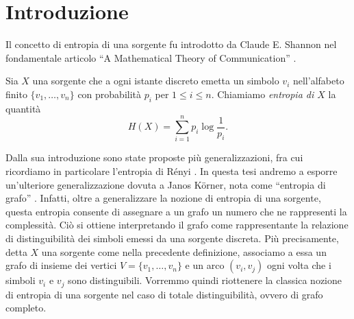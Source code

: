 \chapter{Introduzione} 
Il concetto di entropia di una sorgente fu introdotto da Claude E. Shannon nel fondamentale articolo ``A Mathematical Theory of Communication'' \cite{Shannon1948}.
\begin{definition}
  Sia \(X\) una sorgente che a ogni istante discreto emetta un simbolo \(v_i\) nell'alfabeto finito \(\{v_1,\dots,v_n\}\) con probabilit\`a \(p_i\) per \(1\le i\le n\). Chiamiamo \emph{entropia di \(X\)} la quantit\`a
  \[H(X)=\sum_{i=1}^n{p_i\log{\frac{1}{p_i}}}\text{.}\]
\end{definition}

Dalla sua introduzione sono state proposte più generalizzazioni, fra cui ricordiamo in particolare l'entropia di Rényi \cite{renyi1961}. In questa tesi andremo a esporre un'ulteriore generalizzazione dovuta a Janos K\"orner, nota come ``entropia di grafo'' \cite{Korner1973}. Infatti, oltre a generalizzare la nozione di entropia di una sorgente, questa entropia consente di assegnare a un grafo un numero che ne rappresenti la complessità. Ciò si ottiene interpretando il grafo come rappresentante la relazione di distinguibilità dei simboli emessi da una sorgente discreta. Più precisamente, detta \(X\) una sorgente come nella precedente definizione, associamo a essa un grafo di insieme dei vertici \(V=\{v_1,\dots,v_n\}\) e un arco \((v_i,v_j)\) ogni volta che i simboli \(v_i\) e \(v_j\) sono distinguibili. Vorremmo quindi riottenere la classica nozione di entropia di una sorgente nel caso di totale distinguibilità, ovvero di grafo completo.

